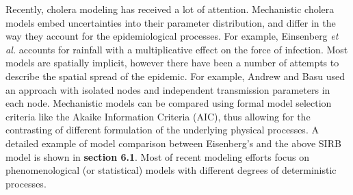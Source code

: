 
Recently, cholera modeling has received a lot of attention. Mechanistic cholera models embed uncertainties into their parameter distribution, and differ in the way they account for the epidemiological processes\cite{Kirpich:ControllingCholeraOuest:2017,Tuite:CholeraEpidemicHaiti:2011,Chao:VaccinationStrategiesEpidemic:2011,Kirpich:CholeraTransmissionOuest:2015}. For example, Einsenberg \textit{et al.} accounts for rainfall with a multiplicative effect on the force of infection\cite{Eisenberg:ExaminingRainfallCholera:2013,Eisenberg:IdentifiabilityEstimationMultiple:2013,Eisenberg:CholeraModelPatchy:2013}. Most models are spatially implicit, however there have been a number of attempts to describe the spatial spread of the epidemic. For example, Andrew and Basu used an approach with isolated nodes and independent transmission parameters in each node\cite{Andrews:TransmissionDynamicsControl:2011}.  Mechanistic models can be compared using formal model selection criteria like the Akaike Information Criteria (AIC)\cite{Akaike:NewLookStatistical:1974}, thus allowing for the contrasting of different formulation of the underlying physical processes\cite{Baracchini:SeasonalityCholeraDynamics:2017,King:InapparentInfectionsCholera:2008,Akman:ExaminationModelsCholera:2016, Rinaldo:Reassessment20102011:2012}. A detailed example of model comparison between Eisenberg's and the above SIRB model is shown in \textbf{section 6.1}. Most of recent modeling efforts focus on phenomenological (or statistical) models with different degrees of deterministic processes\cite{Azman:UrbanCholeraTransmission:2012,Finger:PotentialImpactCasearea:2018,Camacho:CholeraEpidemicYemen:2018,Lessler:MappingBurdenCholera:2018,Koelle:DisentanglingExtrinsicIntrinsic:2004}.





